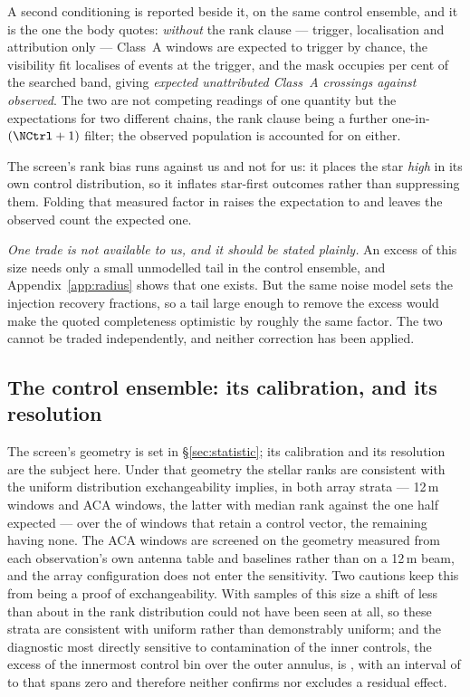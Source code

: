 A second conditioning is reported beside it, on the same control ensemble,
and it is the one the body quotes: \emph{without} the rank clause ---
trigger, localisation and attribution only --- \RsevChanceTrigA{} Class~A
windows are expected to trigger by chance, the visibility fit localises
\RsevChanceFracLoc{} of events at the trigger, and the mask occupies
\RsevChanceOccPct{} per cent of the searched band, giving
\emph{\RsevChanceExp{} expected unattributed Class~A crossings against
\RsevChanceObsAUnattr{} observed}. The two are not competing readings of one
quantity but the expectations for two different chains, the rank clause
being a further one-in-$(\NCtrl+1)$ filter; the observed population is
accounted for on either.

The screen's rank bias runs against us and not for us: it places the star
\emph{high} in its own control distribution, so it inflates star-first
outcomes rather than suppressing them. Folding that measured factor in
raises the expectation to \PriMean{} and leaves the observed count the
expected one.

\emph{One trade is not available to us, and it should be stated plainly.} An
excess of this size needs only a small unmodelled tail in the control
ensemble, and Appendix~\ref{app:radius} shows that one exists. But the same
noise model sets the injection recovery fractions, so a tail large enough to
remove the excess would make the quoted completeness optimistic by roughly
the same factor. The two cannot be traded independently, and neither
correction has been applied.

\subsection{The control ensemble: its calibration, and its resolution}

The screen's geometry is set in \S\ref{sec:statistic}; its calibration and
its resolution are the subject here. Under that geometry the stellar ranks
are consistent with the uniform distribution exchangeability implies, in
both array strata --- \VerTwmAfterN{} 12\,m windows and \VerAcaAfterN{} ACA
windows, the latter with median rank \VerAcaAfterMed{} against the one half
expected --- over the \VerNTested{} of \NWindows{} windows that retain a
control vector, the remaining \VerNUnmatched{} having none. The ACA windows are screened on the
geometry measured from each observation's own antenna table and baselines
rather than on a 12\,m beam, and the array configuration does not enter the
sensitivity. Two cautions keep this from being a proof of exchangeability.
With samples of this size a shift of less than about \VerKsPowerAca{} in
the rank distribution could not have been seen at all, so these strata are
consistent with uniform rather than demonstrably uniform;
and the diagnostic most directly sensitive to contamination of the inner
controls, the excess of the innermost control bin over the outer annulus, is
\VerAcaAfterExc, with an interval of \VerAcaAfterExcLo{} to
\VerAcaAfterExcHi{} that spans zero and therefore neither confirms nor
excludes a residual effect.

